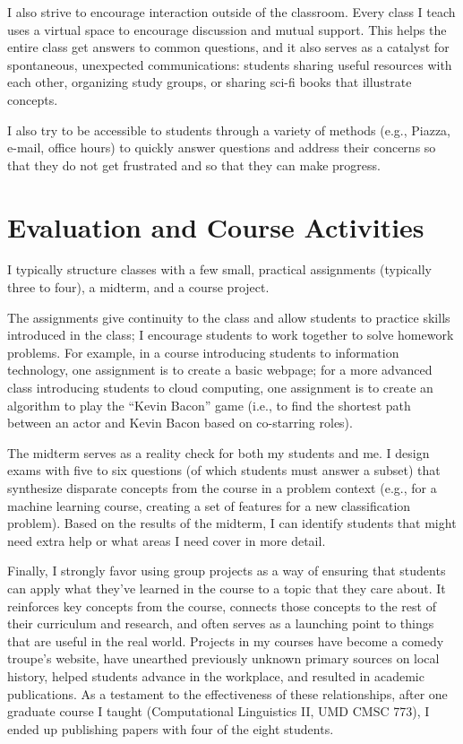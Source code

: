 \documentclass[11pt]{amsart}
\begin{document}
I also strive to encourage interaction outside of the classroom.  Every class I
teach uses a virtual space to encourage discussion and mutual support.  This
helps the entire class get answers to common questions, and it also serves as a
catalyst for spontaneous, unexpected communications: students sharing useful
resources with each other, organizing study groups, or sharing sci-fi books that
illustrate concepts.

I also try to be accessible to students through a variety of methods (e.g.,
Piazza, e-mail, office hours) to quickly answer questions and address their
concerns so that they do not get frustrated and so that they can make progress.

\section{Evaluation and Course Activities}

I typically structure classes with a few small, practical assignments (typically
three to four), a midterm, and a course project.

The assignments give continuity to the class and allow students to practice
skills introduced in the class; I encourage students to work together to solve
homework problems.  For example, in a course introducing students to information
technology, one assignment is to create a basic webpage; for a more advanced
class introducing students to cloud computing, one assignment is to create an
algorithm to play the ``Kevin Bacon'' game (i.e., to find the shortest path
between an actor and Kevin Bacon based on co-starring roles).

The midterm serves as a reality check for both my students and me.  I design
exams with five to six questions (of which students must answer a subset) that
synthesize disparate concepts from the course in a problem context (e.g., for a
machine learning course, creating a set of features for a new classification
problem).  Based on the results of the midterm, I can identify students that
might need extra help or what areas I need cover in more detail.

Finally, I strongly favor using group projects as a way of ensuring that
students can apply what they've learned in the course to a topic that they care
about.  It reinforces key concepts from the course, connects those concepts to
the rest of their curriculum and research, and often serves as a launching point
to things that are useful in the real world.  Projects in my courses have become
a comedy troupe's website, have unearthed previously unknown primary sources on
local history, helped students advance in the workplace, and resulted in
academic publications.  As a testament to the effectiveness of
these relationships, after one graduate course I taught (Computational
Linguistics II, UMD CMSC 773), I ended up publishing papers with four of the
eight students.
\end{document}
